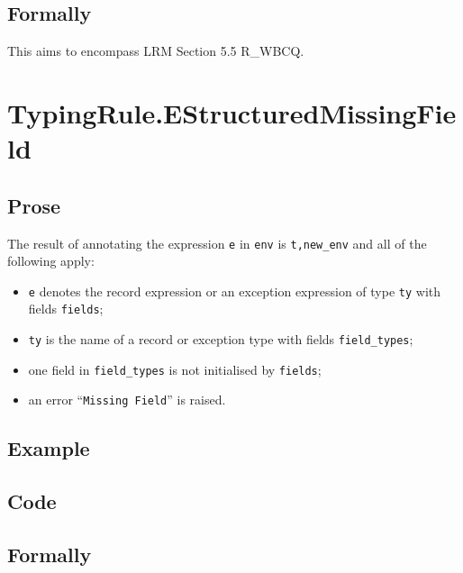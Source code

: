 \documentclass{book}
\begin{document}
\begin{emptyformal}
    \subsection{Formally}
\end{emptyformal}


  This aims to encompass LRM Section 5.5 R\_WBCQ.

\section{TypingRule.EStructuredMissingField \label{sec:TypingRule.EStructuredMissingField}}

  \subsection{Prose}
  The result of annotating the expression \texttt{e} in \texttt{env} is
\texttt{t,new\_env} and all of the following apply:
  \begin{itemize}
  \item \texttt{e} denotes the record expression or an exception expression of type \texttt{ty} with fields \texttt{fields};
  \item \texttt{ty} is the name of a record or exception type with fields \texttt{field\_types};
  \item one field in \texttt{field\_types} is not initialised by \texttt{fields};
  \item an error ``\texttt{Missing Field}'' is raised.
  \end{itemize}

  \subsection{Example}

  \subsection{Code}

\begin{emptyformal}
    \subsection{Formally}
\end{emptyformal}
\end{document}
